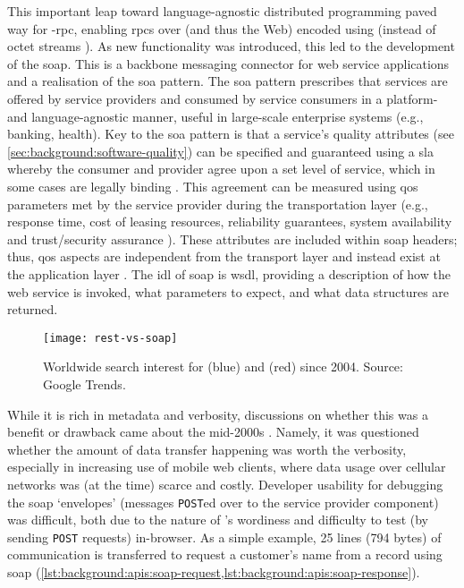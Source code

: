 This important leap toward language-agnostic distributed programming paved way for -\gls{rpc}, enabling \glspl{rpc} over  (and thus the Web) encoded using  (instead of octet streams \citep{OpenSoftwareFoundation:1991vp}). As new functionality was introduced, this led to the development of the \gls{soap}. This is a backbone messaging connector for web service applications and a realisation of the \gls{soa} \citep{Casati:2003vi} pattern. The \gls{soa} pattern prescribes that services are offered by service providers and consumed by service consumers in a platform- and language-agnostic manner, useful in large-scale enterprise systems (e.g., banking, health). Key to the \gls{soa} pattern is that a service's quality attributes (see \cref{sec:background:software-quality}) can be specified and guaranteed using a \gls{sla} whereby the consumer and provider agree upon a set level of service, which in some cases are legally binding \citep{Bass:2003wi}. This agreement can be measured using \gls{qos} parameters met by the service provider during the transportation layer (e.g., response time, cost of leasing resources, reliability guarantees, system availability and trust/security assurance \citep{Hwang:2017tr,Weerawarana:2005wx}). These attributes are included within \gls{soap} headers; thus, \gls{qos} aspects are independent from the transport layer and instead exist at the application layer \citep{Pautasso2008}. The \gls{idl} of \gls{soap} is \gls{wsdl}, providing a description of how the web service is invoked, what parameters to expect, and what data structures are returned.

\begin{figure}[h!]
  \centering
  \texttt{[image: rest-vs-soap]}
  \caption[SOAP versus REST search interest over time]{Worldwide search interest for  (blue) and  (red) since 2004. Source: Google Trends.}
  \label{fig:background:apis:rest-vs-soap}
\end{figure}

While it is rich in metadata and verbosity, discussions on whether this was a benefit or drawback came about the mid-2000s \citep{zurMuehlen:2005ci,Pautasso2008}. Namely, it was questioned whether the amount of data transfer happening was worth the verbosity, especially in increasing use of mobile web clients, where data usage over cellular networks was (at the time) scarce and costly. Developer usability for debugging the \gls{soap} `envelopes' (messages \texttt{POST}ed over  to the service provider component) was difficult, both due to the nature of 's wordiness and difficulty to test (by sending \texttt{POST} requests) in-browser. As a simple example, 25 lines (794 bytes) of  communication is transferred to request a customer's name from a record using \gls{soap} (\cref{lst:background:apis:soap-request,lst:background:apis:soap-response}). 

